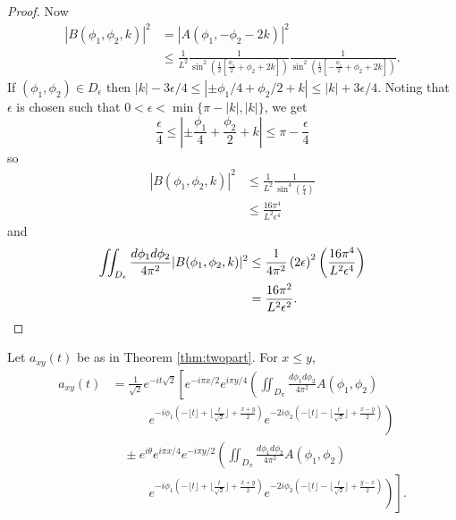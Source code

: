 \documentclass[../thesis-main/thesis-main]{subfiles}
\begin{document}
\begin{proof}
Now
\begin{align*}
|B(\phi_{1},\phi_{2},k)|^{2} & =  |A(\phi_{1},-\phi_{2}-2k)|^{2}\\
 & \leq  \frac{1}{L^{2}}\frac{1}{\sin^{2}\left(\frac{1}{2}
     \left[\frac{\phi_{1}}{2}+\phi_{2}+2k\right]\right)}
 \frac{1}{\sin^{2}\left(\frac{1}{2}
     \left[-\frac{\phi_{1}}{2}+{\phi_{2}}+2k\right]\right)}.
\end{align*}
If $(\phi_{1},\phi_{2})\in D_{\epsilon}$ then $|k|-{3\epsilon}/{4} 
\leq\left|\pm{\phi_{1}}/{4}+{\phi_{2}}/{2}+k\right|
\leq|k|+{3\epsilon}/{4}$.
Noting that $\epsilon$ is chosen such that $0 < \epsilon < 
\min \{\pi-|k|,|k|\}$, we get
\[
\frac{\epsilon}{4}\leq\left|\pm\frac{\phi_{1}}{4}+\frac{\phi_{2}}{2}+k\right|\leq\pi-\frac{\epsilon}{4}
\]
so 
\begin{align*}
|B(\phi_{1},\phi_{2},k)|^{2} & \leq  \frac{1}{L^{2}}\frac{1}{\sin^{4}(\frac{\epsilon}{4})}\\
 	& \leq  \frac{16\pi^{4}}{L^{2}\epsilon^{4}}
\end{align*}
and 
\begin{align*}
\iint_{D_{\epsilon}}\frac{d\phi_{1}d\phi_{2}}{4\pi^{2}}|B(\phi_{1},\phi_{2},k)|^{2} & \leq  \frac{1}{4\pi^{2}}\left(2\epsilon\right)^{2}\left(\frac{16\pi^{4}}{L^{2}\epsilon^{4}}\right)\\
 & =  \frac{16\pi^{2}}{L^{2}\epsilon^{2}}. \qedhere
 \end{align*}
\end{proof}

\begin{lemma}
\label{lem:a_xy}
Let $a_{xy}(t)$ be as in Theorem \ref{thm:twopart}. For $x\leq y$,
\begin{align*}
a_{xy}(t) & =  \frac{1}{\sqrt{2}} e^{- i t\sqrt{2}}\left[e^{-i \pi x/2} e^{i \pi y/4} \left(\iint_{D_{\pi}} 
	\frac{d\phi_1 d\phi_2}{4\pi^2} A(\phi_1,\phi_2)\right.\right.\\
	& \qquad\quad \left.e^{-i \phi_1 \left( -\lfloor t\rfloor + \lfloor
	\frac{t}{\sqrt{2}}\rfloor + \frac{x+y}{2} \right)} e^{-2 i \phi_2 \left(-\lfloor t 
	\rfloor -\lfloor \frac{t}{\sqrt{2}}\rfloor + \frac{x-y}{2}\right)}\right)\\
& \quad \pm e^{i\theta} e^{i\pi x/4}e^{-i \pi y/2} \left(\iint_{D_{\pi}} \frac{d\phi_1 d\phi_2}{4\pi^2}
	A(\phi_1,\phi_2) \right.\\
&	\qquad\quad\left.\left.e^{- i \phi_1 \left(- \lfloor t\rfloor + \lfloor \frac{t}{\sqrt{2}}\rfloor + 
	\frac{x+y}{2}\right) } e^{-2 i \phi_2 \left(-\lfloor t \rfloor -\lfloor \frac{t}{\sqrt{2}}\rfloor
	+ \frac{y-x}{2}\right)}\right)
	\right].
\end{align*}
\end{lemma}
\end{document}
